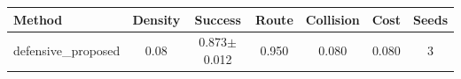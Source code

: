\begin{tabular}{lcccccc}
\toprule
Method & Density & Success & Route & Collision & Cost & Seeds \\ 
\midrule
defensive_proposed & 0.08 & 0.873$\pm$0.012 & 0.950 & 0.080 & 0.080 & 3 \\ 
\bottomrule
\end{tabular}
